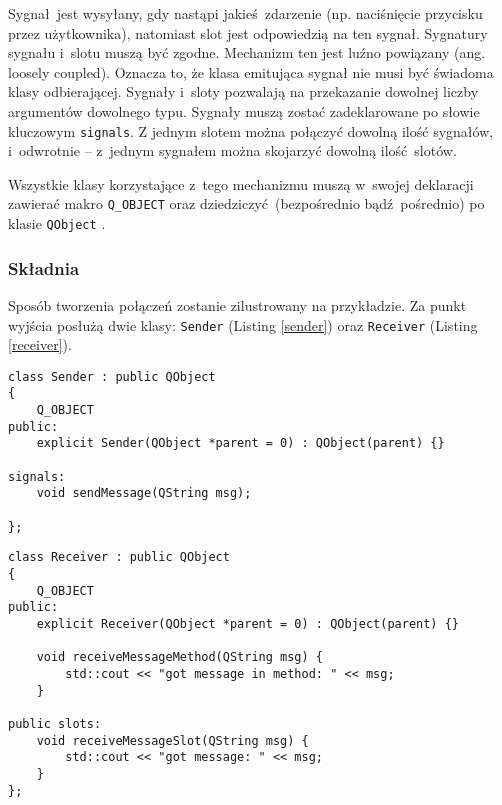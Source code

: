 Sygnał jest wysyłany, gdy nastąpi jakieś zdarzenie (np. naciśnięcie przycisku przez użytkownika), natomiast slot jest odpowiedzią na ten sygnał. Sygnatury sygnału i~slotu muszą być zgodne. Mechanizm ten jest luźno powiązany (ang. loosely coupled). Oznacza to, że klasa emitująca sygnał nie musi być świadoma klasy odbierającej. Sygnały i~sloty pozwalają na przekazanie dowolnej liczby argumentów dowolnego typu. Sygnały muszą zostać zadeklarowane po słowie kluczowym \lstinline$signals$. Z jednym slotem można połączyć dowolną ilość sygnałów, i~odwrotnie -- z~jednym sygnałem można skojarzyć dowolną ilość slotów.

Wszystkie klasy korzystające z~tego mechanizmu muszą w~swojej deklaracji zawierać makro \lstinline$Q_OBJECT$ oraz dziedziczyć (bezpośrednio bądź pośrednio) po klasie \lstinline$QObject$ \cite{Qtdoc}.


\subsubsection{Składnia} 
Sposób tworzenia połączeń zostanie zilustrowany na przykładzie. Za punkt wyjścia posłużą dwie klasy: \lstinline$Sender$ (Listing \ref{sender}) oraz \lstinline$Receiver$ (Listing \ref{receiver}).

\begin{minipage}{\textwidth}
	\begin{lstlisting}[label=sender,caption=Deklaracja klasy \lstinline$Sender$]
class Sender : public QObject
{
	Q_OBJECT
public:
	explicit Sender(QObject *parent = 0) : QObject(parent) {}
	
signals:
	void sendMessage(QString msg);
	
};
	\end{lstlisting}
\end{minipage}

\begin{minipage}{\textwidth}
	\begin{lstlisting}[label=receiver, caption=Deklaracja klasy \lstinline$Receiver$]
class Receiver : public QObject
{
	Q_OBJECT
public:
	explicit Receiver(QObject *parent = 0) : QObject(parent) {}
	
	void receiveMessageMethod(QString msg) {
		std::cout << "got message in method: " << msg;
	}
	
public slots:
	void receiveMessageSlot(QString msg) {
		std::cout << "got message: " << msg;
	}
};
	\end{lstlisting}
\end{minipage}


